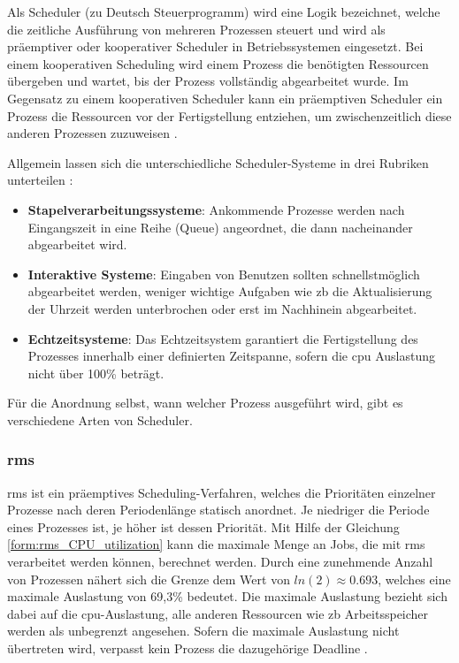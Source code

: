 \documentclass[../EDF Master Thesis.tex]{subfiles}
\begin{document}
Als Scheduler (zu Deutsch Steuerprogramm) wird eine Logik bezeichnet, welche die zeitliche Ausführung von mehreren Prozessen steuert und wird als präemptiver oder kooperativer Scheduler in Betriebssystemen eingesetzt.
Bei einem kooperativen Scheduling wird einem Prozess die benötigten Ressourcen übergeben und wartet, bis der Prozess vollständig abgearbeitet wurde.
Im Gegensatz zu einem kooperativen Scheduler kann ein präemptiven Scheduler ein Prozess die Ressourcen vor der Fertigstellung entziehen, um zwischenzeitlich diese anderen Prozessen zuzuweisen \parencite{wiki:003}.

Allgemein lassen sich die unterschiedliche Scheduler-Systeme in drei Rubriken unterteilen \parencite{wiki:007}:
\begin{itemize}
    \item \textbf{Stapelverarbeitungssysteme}: Ankommende Prozesse werden nach Eingangszeit in eine Reihe (Queue) angeordnet, die dann nacheinander abgearbeitet wird.
    \item \textbf{Interaktive Systeme}: Eingaben von Benutzen sollten schnellstmöglich abgearbeitet werden, weniger wichtige Aufgaben wie \ac{zb} die Aktualisierung der Uhrzeit werden unterbrochen oder erst im Nachhinein abgearbeitet.
    \item \textbf{Echtzeitsysteme}: Das Echtzeitsystem garantiert die Fertigstellung des Prozesses innerhalb einer definierten Zeitspanne, sofern die \ac{cpu} Auslastung nicht über 100\% beträgt.
\end{itemize}
Für die Anordnung selbst, wann welcher Prozess ausgeführt wird, gibt es verschiedene Arten von Scheduler.


\subsubsection{\ac{rms}}
    \ac{rms} ist ein präemptives Scheduling-Verfahren, welches die Prioritäten einzelner Prozesse nach deren Periodenlänge statisch anordnet.
    Je niedriger die Periode eines Prozesses ist, je höher ist dessen Priorität.
    Mit Hilfe der Gleichung \ref{form:rms_CPU_utilization} kann die maximale Menge an Jobs, die mit \ac{rms} verarbeitet werden können, berechnet werden.
    Durch eine zunehmende Anzahl von Prozessen nähert sich die Grenze dem Wert von $ln(2) \approx 0.693$, welches eine maximale Auslastung von 69,3\% bedeutet.
    Die maximale Auslastung bezieht sich dabei auf die \ac{cpu}-Auslastung, alle anderen Ressourcen wie \ac{zb} Arbeitsspeicher werden als unbegrenzt angesehen.
    Sofern die maximale Auslastung nicht übertreten wird, verpasst kein Prozess die dazugehörige Deadline \parencite{wiki:004}.
\end{document}
